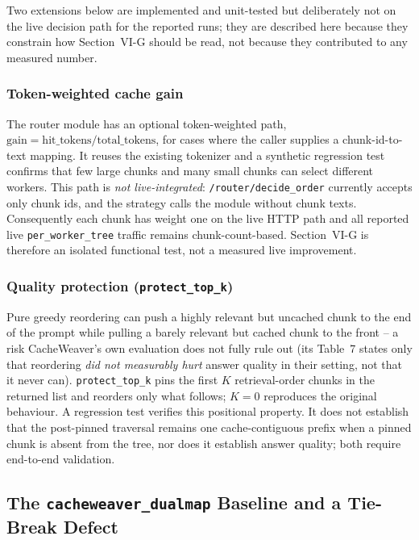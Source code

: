 \documentclass[conference]{IEEEtran}
\begin{document}
Two extensions below are implemented and unit-tested but deliberately
not on the live decision path for the reported runs; they are described
here because they constrain how Section~VI-G should be read, not because
they contributed to any measured number.

\subsubsection{Token-weighted cache gain} The router module has an
optional token-weighted path,
$\text{gain}=\text{hit\_tokens}/\text{total\_tokens}$, for cases where
the caller supplies a chunk-id-to-text mapping. It reuses the existing
tokenizer and a synthetic regression test confirms that few large
chunks and many small chunks can select different workers. This path is
\emph{not live-integrated}: \texttt{/router/decide\_order} currently
accepts only chunk ids, and the strategy calls the module without chunk
texts. Consequently each chunk has weight one on the live HTTP path and
all reported live \texttt{per\_worker\_tree} traffic remains
chunk-count-based. Section~VI-G is therefore an isolated functional
test, not a measured live improvement.

\subsubsection{Quality protection (\texttt{protect\_top\_k})} Pure
greedy reordering can push a highly relevant but uncached chunk to the
end of the prompt while pulling a barely relevant but cached chunk to
the front -- a risk CacheWeaver's own evaluation does not fully rule
out (its Table~7 states only that reordering \emph{did not measurably
hurt} answer quality in their setting, not that it never can).
\texttt{protect\_top\_k} pins the first $K$ retrieval-order chunks in
the returned list and reorders only what follows; $K{=}0$ reproduces the
original behaviour. A regression test verifies this positional
property. It does not establish that the post-pinned traversal remains
one cache-contiguous prefix when a pinned chunk is absent from the
tree, nor does it establish answer quality; both require end-to-end
validation.

\subsection{The \texttt{cacheweaver\_dualmap} Baseline and a Tie-Break Defect}
\end{document}
